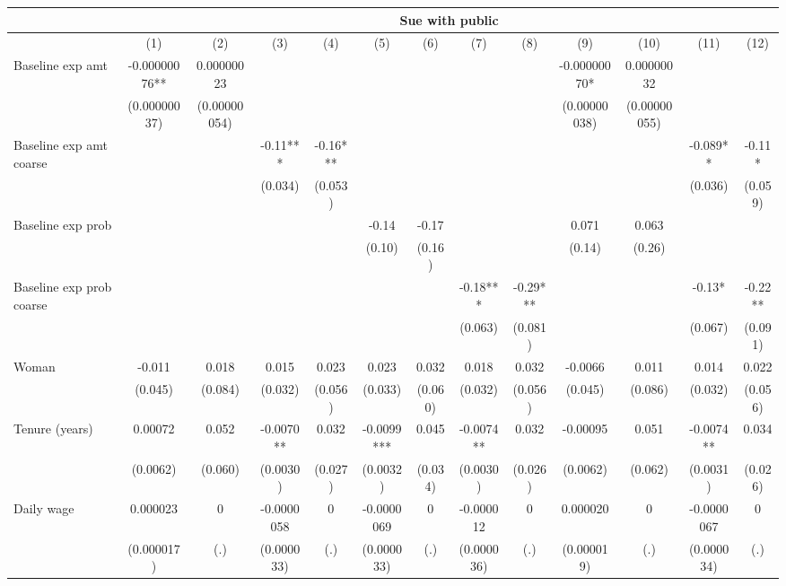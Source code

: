 \begin{tabular}{lcccccccccccc}
\toprule
      & \multicolumn{12}{c}{Sue with public} \\
\midrule
\midrule
      & (1)   & (2)   & (3)   & (4)   & (5)   & (6)   & (7)   & (8)   & (9)   & (10)  & (11)  & (12) \\
\midrule
\midrule
Baseline exp amt & -0.00000076** & 0.00000023 &       &       &       &       &       &       & -0.00000070* & 0.00000032 &       &  \\
      & (0.00000037) & (0.00000054) &       &       &       &       &       &       & (0.00000038) & (0.00000055) &       &  \\
Baseline exp amt coarse &       &       & -0.11*** & -0.16*** &       &       &       &       &       &       & -0.089** & -0.11* \\
      &       &       & (0.034) & (0.053) &       &       &       &       &       &       & (0.036) & (0.059) \\
Baseline exp prob &       &       &       &       & -0.14 & -0.17 &       &       & 0.071 & 0.063 &       &  \\
      &       &       &       &       & (0.10) & (0.16) &       &       & (0.14) & (0.26) &       &  \\
Baseline exp prob coarse &       &       &       &       &       &       & -0.18*** & -0.29*** &       &       & -0.13* & -0.22** \\
      &       &       &       &       &       &       & (0.063) & (0.081) &       &       & (0.067) & (0.091) \\
Woman & -0.011 & 0.018 & 0.015 & 0.023 & 0.023 & 0.032 & 0.018 & 0.032 & -0.0066 & 0.011 & 0.014 & 0.022 \\
      & (0.045) & (0.084) & (0.032) & (0.056) & (0.033) & (0.060) & (0.032) & (0.056) & (0.045) & (0.086) & (0.032) & (0.056) \\
Tenure (years) & 0.00072 & 0.052 & -0.0070** & 0.032 & -0.0099*** & 0.045 & -0.0074** & 0.032 & -0.00095 & 0.051 & -0.0074** & 0.034 \\
      & (0.0062) & (0.060) & (0.0030) & (0.027) & (0.0032) & (0.034) & (0.0030) & (0.026) & (0.0062) & (0.062) & (0.0031) & (0.026) \\
Daily wage & 0.000023 & 0     & -0.0000058 & 0     & -0.0000069 & 0     & -0.000012 & 0     & 0.000020 & 0     & -0.0000067 & 0 \\
      & (0.000017) & (.)   & (0.000033) & (.)   & (0.000033) & (.)   & (0.000036) & (.)   & (0.000019) & (.)   & (0.000034) & (.) \\

\end{tabular}
